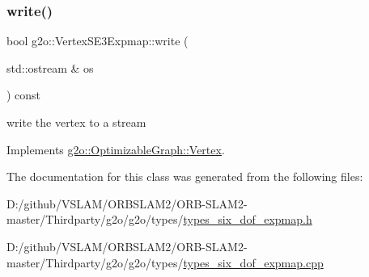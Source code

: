 \mbox{\label{classg2o_1_1_vertex_s_e3_expmap_ac1dfa6c71532f2e0bed236220bc1b604}} 
\subsubsection{\texorpdfstring{write()}{write()}}
{\footnotesize\ttfamily bool g2o\+::\+Vertex\+S\+E3\+Expmap\+::write (\begin{DoxyParamCaption}\item[{std\+::ostream \&}]{os }\end{DoxyParamCaption}) const\hspace{0.3cm}{\ttfamily [virtual]}}



write the vertex to a stream 



Implements \mbox{\hyperlink{classg2o_1_1_optimizable_graph_1_1_vertex_a4cac277db656fddb5f844d9009d601eb}{g2o\+::\+Optimizable\+Graph\+::\+Vertex}}.



The documentation for this class was generated from the following files\+:\begin{DoxyCompactItemize}
\item 
D\+:/github/\+V\+S\+L\+A\+M/\+O\+R\+B\+S\+L\+A\+M2/\+O\+R\+B-\/\+S\+L\+A\+M2-\/master/\+Thirdparty/g2o/g2o/types/\mbox{\hyperlink{types__six__dof__expmap_8h}{types\+\_\+six\+\_\+dof\+\_\+expmap.\+h}}\item 
D\+:/github/\+V\+S\+L\+A\+M/\+O\+R\+B\+S\+L\+A\+M2/\+O\+R\+B-\/\+S\+L\+A\+M2-\/master/\+Thirdparty/g2o/g2o/types/\mbox{\hyperlink{types__six__dof__expmap_8cpp}{types\+\_\+six\+\_\+dof\+\_\+expmap.\+cpp}}\end{DoxyCompactItemize}

